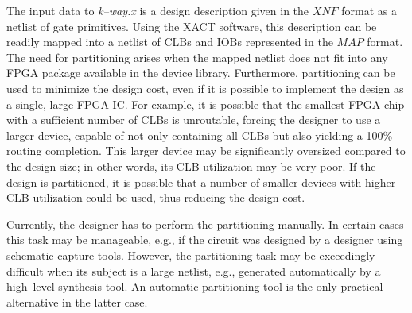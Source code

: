 The input data to {\sl k--way.x} is a design description given in the 
$XNF$ format as a netlist of gate primitives.
Using the XACT software, this description can be readily mapped into a 
netlist of CLBs and IOBs represented in the $MAP$ format.
The need for partitioning arises when the mapped netlist does not fit 
into any FPGA package available in the device library.
Furthermore, partitioning can be used to minimize the design cost, even 
if it is possible to implement the design as a single, large FPGA IC.
For example, it is possible that the smallest FPGA chip with a 
sufficient number of CLBs is unroutable, forcing the designer to use
a larger device, capable of not only containing all CLBs but also 
yielding a 100\% routing completion.
This larger device may be significantly oversized compared to the 
design size; in other words, its CLB utilization may be very poor.
If the design is partitioned, it is possible that a number of smaller 
devices with higher CLB utilization could be used, thus reducing the 
design cost.
\par
Currently, the designer has to perform the partitioning manually.
In certain cases this task may be manageable, e.g., if the circuit 
was designed by a designer using schematic capture tools.
However, the partitioning task may be exceedingly difficult when its 
subject is a large netlist, e.g., generated automatically by a 
high--level synthesis tool.
An automatic partitioning tool is the only practical alternative in the 
latter case.




